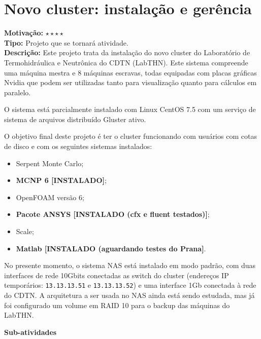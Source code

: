 \chapter{Novo cluster: instalação e gerência}

\textbf{Motivação:} $\star\star\star\star$\\

\textbf{Tipo:} Projeto que se tornará atividade.\\

\textbf{Descrição:} Este projeto trata da instalação do novo cluster do Laboratório 
de Termohidráulica e Neutrônica do CDTN (LabTHN). Este sistema compreende uma máquina mestra e 8 máquinas escravas, todas equipadas com placas gráficas Nvidia que podem ser utilizadas tanto para visualização quanto para cálculos em paralelo.

O sistema está parcialmente instalado com Linux CentOS 7.5 com um serviço de 
sistema de arquivos distribuído Gluster ativo. 

O objetivo final deste projeto é ter o cluster funcionando com usuários com cotas 
de disco e com os seguintes sistemas instalados:

\begin{itemize}
	\item Serpent Monte Carlo;
	\item \textbf{MCNP 6 [INSTALADO]};
	\item OpenFOAM versão 6;
	\item \textbf{Pacote ANSYS [INSTALADO (cfx e fluent testados)]};
	\item Scale;
	\item \textbf{Matlab [INSTALADO (aguardando testes do Prana]}.
\end{itemize}

No presente momento, o sistema NAS está instalado em modo padrão, com duas 
interfaces de rede 10Gbits conectadas as switch do cluster (endereços IP 
temporários: \texttt{13.13.13.51} e \texttt{13.13.13.52}) e uma interface 
1Gb conectada à rede do CDTN. A arquitetura a ser usada no NAS ainda está sendo 
estudada, mas já foi configurado um volume em RAID 10 para o backup das máquinas 
do LabTHN.

\textbf{Sub-atividades}

